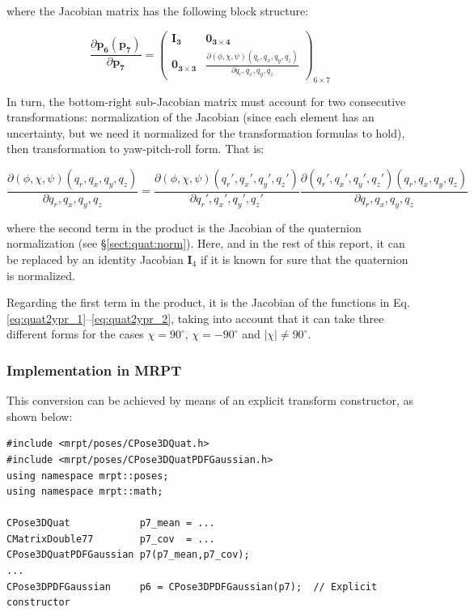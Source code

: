 \documentclass[a4paper,11pt]{report}
\begin{document}
\noindent where the Jacobian matrix has the following block structure:

\begin{equation}
\label{eq:jac_p6_p7}
\frac{\partial \mathbf{p_6}(\mathbf{p_7}) }{\partial \mathbf{p_7}} =
\left(
\begin{array}{c|c}
 \mathbf{I_3} & \mathbf{0_{3\times 4}} \\ \hline
 \mathbf{0_{3\times 3}} &  \frac{\partial (\phi,\chi,\psi)(q_r,q_x,q_y,q_z)}{\partial q_r,q_x,q_y,q_z}
\end{array}
\right)_{6 \times 7}
\end{equation}

In turn, the bottom-right sub-Jacobian matrix must account for two consecutive transformations:
normalization of the Jacobian (since each element has an uncertainty, but we need it normalized
for the transformation formulas to hold), then transformation to yaw-pitch-roll form. That is:

\begin{equation}
\frac{\partial (\phi,\chi,\psi)(q_r,q_x,q_y,q_z)}{\partial q_r,q_x,q_y,q_z} =
\frac{\partial (\phi,\chi,\psi)(q_r',q_x',q_y',q_z')}{\partial q_r',q_x',q_y',q_z'}
\frac{\partial (q_r',q_x',q_y',q_z')(q_r,q_x,q_y,q_z)}{\partial q_r,q_x,q_y,q_z}
\end{equation}

\noindent where the second term in the product is the Jacobian of the quaternion
normalization (see \S \ref{sect:quat:norm}). Here, and in the rest of this report,
it can be replaced by an identity Jacobian $\mathbf{I}_4$ if it is known for sure that
the quaternion is normalized.

Regarding the first term in the product, it is the
Jacobian of the functions in Eq. \ref{eq:quat2ypr_1}--\ref{eq:quat2ypr_2}, taking
into account that it can take three different forms for the cases $\chi=90^\circ$,
$\chi=-90^\circ$ and $|\chi| \neq 90^\circ$.

\subsubsection{Implementation in MRPT}

This conversion can be achieved by means of an explicit transform constructor, as shown below:

\begin{lstlisting}
#include <mrpt/poses/CPose3DQuat.h>
#include <mrpt/poses/CPose3DQuatPDFGaussian.h>
using namespace mrpt::poses;
using namespace mrpt::math;

CPose3DQuat            p7_mean = ...
CMatrixDouble77        p7_cov  = ...
CPose3DQuatPDFGaussian p7(p7_mean,p7_cov);
...
CPose3DPDFGaussian     p6 = CPose3DPDFGaussian(p7);  // Explicit constructor
\end{lstlisting}
\end{document}
